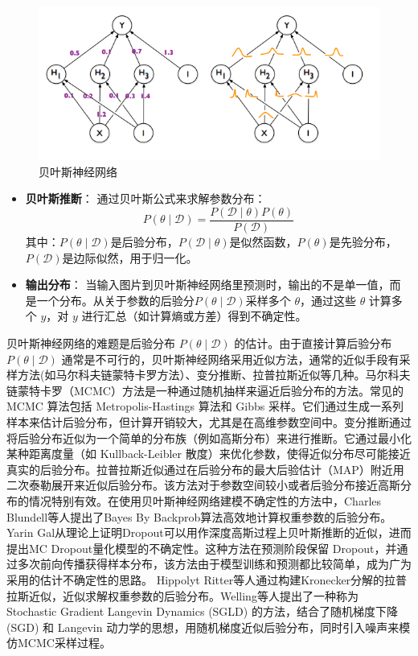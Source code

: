 \begin{figure}[H]
    \centering
    \includegraphics[width=0.75\linewidth]{assets/2-1.png}
    \caption{贝叶斯神经网络\cite{blundell2015weight}
}
    \label{fig:bnn}
\end{figure}


\begin{itemize}
    \item \textbf{贝叶斯推断}：
    通过贝叶斯公式来求解参数分布：
    \[
    P(\theta \mid \mathcal{D}) = \frac{P(\mathcal{D} \mid \theta) P(\theta)}{P(\mathcal{D})}
    \]
    其中：\( P(\theta \mid \mathcal{D}) \)是后验分布，\( P(\mathcal{D} \mid \theta) \)是似然函数，\( P(\theta) \)是先验分布， \( P(\mathcal{D}) \)是边际似然，用于归一化。

    
    \item \textbf{输出分布}：
    当输入图片到贝叶斯神经网络里预测时，输出的不是单一值，而是一个分布。从关于参数的后验分\( P(\theta \mid \mathcal{D}) \)采样多个 \( \theta \)，通过这些 \( \theta \) 计算多个 \( y \)，对 \( y \) 进行汇总（如计算熵或方差）得到不确定性。
\end{itemize}

贝叶斯神经网络的难题是后验分布 \( P(\theta \mid \mathcal{D}) \) 的估计。由于直接计算后验分布 \( P(\theta \mid \mathcal{D}) \) 通常是不可行的，贝叶斯神经网络采用近似方法，通常的近似手段有采样方法(如马尔科夫链蒙特卡罗方法）、变分推断、拉普拉斯近似等几种。马尔科夫链蒙特卡罗（MCMC）方法是一种通过随机抽样来逼近后验分布的方法。常见的 MCMC 算法包括 Metropolis-Hastings 算法和 Gibbs 采样。它们通过生成一系列样本来估计后验分布，但计算开销较大，尤其是在高维参数空间中。变分推断通过将后验分布近似为一个简单的分布族（例如高斯分布）来进行推断。它通过最小化某种距离度量（如 Kullback-Leibler 散度）来优化参数，使得近似分布尽可能接近真实的后验分布。拉普拉斯近似通过在后验分布的最大后验估计（MAP）附近用二次泰勒展开来近似后验分布。该方法对于参数空间较小或者后验分布接近高斯分布的情况特别有效。在使用贝叶斯神经网络建模不确定性的方法中，Charles Blundell\cite{blundell2015weight}等人提出了Bayes By Backprob算法高效地计算权重参数的后验分布。Yarin Gal\cite{gal2016dropout}从理论上证明Dropout可以用作深度高斯过程上贝叶斯推断的近似，进而提出MC Dropout量化模型的不确定性。这种方法在预测阶段保留 Dropout，并通过多次前向传播获得样本分布，该方法由于模型训练和预测都比较简单，成为广为采用的估计不确定性的思路。 Hippolyt Ritter\cite{ritter2018scalable}等人通过构建Kronecker分解的拉普拉斯近似，近似求解权重参数的后验分布。Welling等人\cite{welling2011bayesian}提出了一种称为 Stochastic Gradient Langevin Dynamics (SGLD) 的方法，结合了随机梯度下降 (SGD) 和 Langevin 动力学的思想，用随机梯度近似后验分布，同时引入噪声来模仿MCMC采样过程。



